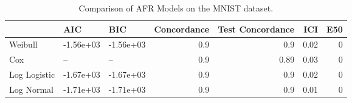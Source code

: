 \begin{table*}
\centering
\caption{Comparison of AFR Models on the MNIST dataset.}
\label{tab:mnist}
\begin{tabular}{lllrrrr}
\toprule
 & AIC & BIC & Concordance & Test Concordance & ICI & E50 \\
\midrule
Weibull & -1.56e+03 & -1.56e+03 & 0.9 & 0.9 & 0.02 & 0 \\
Cox & -- & -- & 0.9 & 0.89 & 0.03 & 0 \\
Log Logistic & -1.67e+03 & -1.67e+03 & 0.9 & 0.9 & 0.02 & 0 \\
Log Normal & -1.71e+03 & -1.71e+03 & 0.9 & 0.9 & 0.01 & 0 \\
\bottomrule
\end{tabular}
\end{table*}

